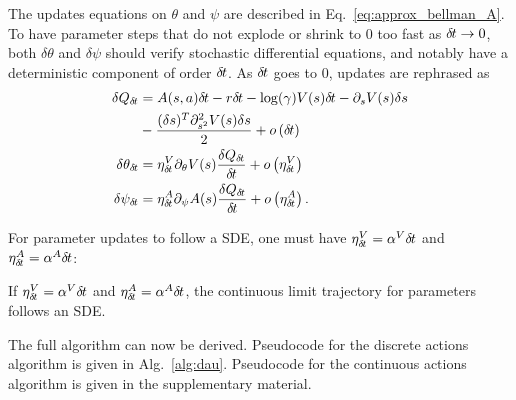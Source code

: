 The updates equations on $\theta$ and $\psi$ are described in
Eq.~\eqref{eq:approx_bellman_A}.  To have parameter steps that do not explode or shrink to $0$ too
fast as ${\delta\hspace{-.1em}t} \rightarrow 0$, both $\delta \theta$ and
$\delta \psi$ should verify stochastic differential equations, and notably
have a deterministic component of order ${\delta\hspace{-.1em}t}$. As ${\delta\hspace{-.1em}t}$ goes to $0$,
updates are rephrased as
\begin{align}
	\delta Q_{\delta\hspace{-.1em}t} &= A(s, a){\delta\hspace{-.1em}t} - r{\delta\hspace{-.1em}t} - \log(\gamma) V(s){\delta\hspace{-.1em}t} - \partial_s V(s) \delta s\nonumber \\&- \frac{(\delta s)^T \partial_{s^2}^2 V(s) \delta s}{2} + o\left({\delta\hspace{-.1em}t}\right)\\
	\delta \theta_{\delta\hspace{-.1em}t} &= \eta^V_{\delta\hspace{-.1em}t} \partial_{\theta} V(s) \frac{\delta Q_{\delta\hspace{-.1em}t}}{{\delta\hspace{-.1em}t}} + o\left(\eta^V_{\delta\hspace{-.1em}t}\right)\\
	\delta \psi_{\delta\hspace{-.1em}t} &= \eta^A_{\delta\hspace{-.1em}t} \partial_{\psi} A(s) \frac{\delta Q_{\delta\hspace{-.1em}t}}{{\delta\hspace{-.1em}t}} + o\left(\eta^A_{\delta\hspace{-.1em}t}\right).
\end{align}


For parameter updates to follow a SDE, one must
have $\eta^V_{\delta\hspace{-.1em}t} = \alpha^V {\delta\hspace{-.1em}t}$ and $\eta^A_{\delta\hspace{-.1em}t} = \alpha^A
{\delta\hspace{-.1em}t}$:
\begin{theorem}
  If $\eta^V_{\delta\hspace{-.1em}t} = \alpha^V {\delta\hspace{-.1em}t}$ and $\eta^A_{\delta\hspace{-.1em}t} = \alpha^A{\delta\hspace{-.1em}t}$, the continuous limit trajectory for parameters follows an SDE.
\end{theorem}

The full algorithm can now be derived.
Pseudocode for the discrete actions algorithm is given in Alg.~\ref{alg:dau}.
Pseudocode for the continuous actions algorithm is given in the supplementary
material.

